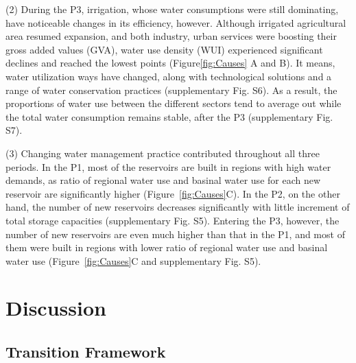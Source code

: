 \documentclass[9pt, twocolumn, twoside, lineno]{pnas-new}
\begin{document}
(2) During the P3, irrigation, whose water consumptions were still dominating, have noticeable changes in its efficiency, however. Although irrigated agricultural area resumed expansion, and both industry, urban services were boosting their gross added values (GVA), water use density (WUI) experienced significant declines and reached the lowest points (Figure\ref{fig:Causes} A and B). It means, water utilization ways  have changed, along with technological solutions and a range of water conservation practices (supplementary Fig. S6). As a result, the proportions of water use between the different sectors tend to average out while the total water consumption remains stable, after the P3 (supplementary Fig. S7).

(3) Changing water management practice contributed throughout all three periods. In the P1, most of the reservoirs are built in regions with high water demands, as ratio of regional water use and basinal water use for each new reservoir are significantly higher (Figure~\ref{fig:Causes}C). In the P2, on the other hand, the number of new reservoirs decreases significantly with little increment of total storage capacities (supplementary Fig. S5). Entering the P3, however, the number of new reservoirs are even much higher than that in the P1, and most of them were built in regions with lower ratio of regional water use and basinal water use (Figure~\ref{fig:Causes}C and supplementary Fig. S5).

\section*{Discussion}

\subsection*{Transition Framework}
\end{document}
